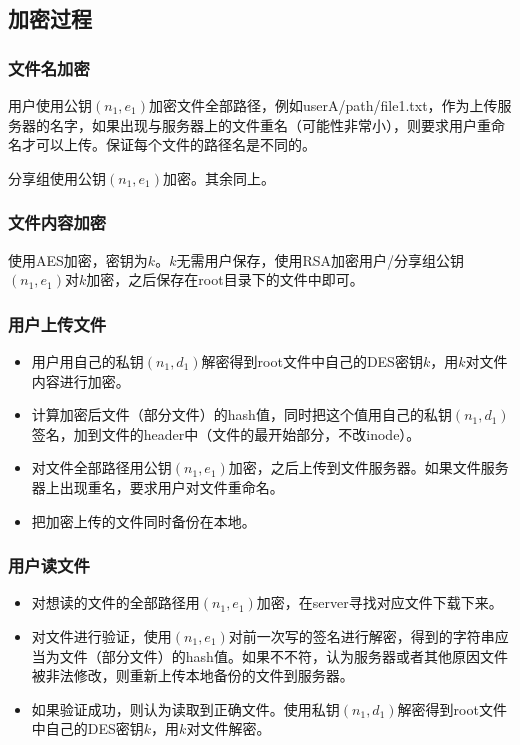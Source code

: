 \documentclass[11pt, oneside]{ctexart}
\begin{document}
\subsection{加密过程}
\subsubsection{文件名加密}
用户使用公钥$(n_1, e_1)$加密文件全部路径，例如userA/path/file1.txt，作为上传服务器的名字，如果出现与服务器上的文件重名（可能性非常小），则要求用户重命名才可以上传。保证每个文件的路径名是不同的。

分享组使用公钥$(n_1, e_1)$加密。其余同上。

\subsubsection{文件内容加密}
使用AES加密，密钥为$k$。$k$无需用户保存，使用RSA加密用户/分享组公钥$(n_1, e_1)$对$k$加密，之后保存在root目录下的文件中即可。

\subsubsection{用户上传文件}\label{sec:user-upload}
\begin{itemize}
\item 用户用自己的私钥$(n_1, d_1)$解密得到root文件中自己的DES密钥$k$，用$k$对文件内容进行加密。
\item 计算加密后文件（部分文件）的hash值，同时把这个值用自己的私钥$(n_1, d_1)$签名，加到文件的header中（文件的最开始部分，不改inode）。
\item 对文件全部路径用公钥$(n_1, e_1)$加密，之后上传到文件服务器。如果文件服务器上出现重名，要求用户对文件重命名。
\item 把加密上传的文件同时备份在本地。
\end{itemize}

\subsubsection{用户读文件}\label{sec:user-read}
\begin{itemize}
\item 对想读的文件的全部路径用$(n_1, e_1)$加密，在server寻找对应文件下载下来。
\item 对文件进行验证，使用$(n_1, e_1)$对前一次写的签名进行解密，得到的字符串应当为文件（部分文件）的hash值。如果不不符，认为服务器或者其他原因文件被非法修改，则重新上传本地备份的文件到服务器。
\item 如果验证成功，则认为读取到正确文件。使用私钥$(n_1, d_1)$解密得到root文件中自己的DES密钥$k$，用$k$对文件解密。
\end{itemize}
\end{document}
